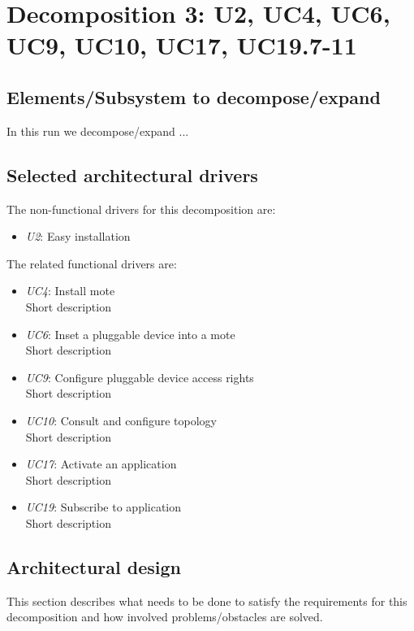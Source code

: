 \section{Decomposition 3: U2, UC4, UC6, UC9, UC10, UC17, UC19.7-11}

\subsection{Elements/Subsystem to decompose/expand}
    In this run we decompose/expand ...


\subsection{Selected architectural drivers}
    The non-functional drivers for this decomposition are:
    \begin{itemize}
    	\item \emph{U2}: Easy installation
    \end{itemize}

    The related functional drivers are:
    \begin{itemize}
        \item \emph{UC4}: Install mote \\
              Short description
        \item \emph{UC6}: Inset a pluggable device into a mote \\
              Short description
        \item \emph{UC9}: Configure pluggable device access rights \\
              Short description
        \item \emph{UC10}: Consult and configure topology \\
              Short description
        \item \emph{UC17}: Activate an application \\
              Short description
        \item \emph{UC19}: Subscribe to application \\
              Short description
    \end{itemize}


\subsection{Architectural design}
    This section describes what needs to be done to satisfy the requirements for
    this decomposition and how involved problems/obstacles are solved.

